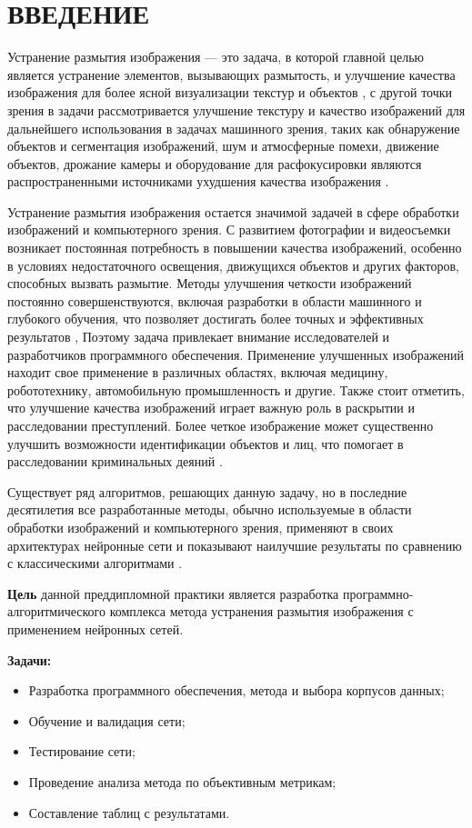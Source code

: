 \part*{ВВЕДЕНИЕ}

Устранение размытия изображения — это задача, в которой главной целью является устранение элементов, вызывающих размытость, и улучшение качества изображения для более ясной визуализации текстур и объектов \cite{shen2018deep}, с другой точки зрения в задачи рассмотривается улучшение текстуру и качество изображений для дальнейшего использования в задачах машинного зрения, таких как обнаружение объектов и сегментация изображений, шум и атмосферные помехи, движение объектов, дрожание камеры и оборудование для расфокусировки являются распространенными источниками ухудшения качества изображения \cite{NIPS2009_3dd48ab3}.

Устранение размытия изображения остается значимой задачей в сфере обработки изображений и компьютерного зрения. С развитием фотографии и видеосъемки возникает постоянная потребность в повышении качества изображений, особенно в условиях недостаточного освещения, движущихся объектов и других факторов, способных вызвать размытие. Методы улучшения четкости изображений постоянно совершенствуются, включая разработки в области машинного и глубокого обучения, что позволяет достигать более точных и эффективных результатов \cite{Lian2023}, Поэтому задача привлекает внимание исследователей и разработчиков программного обеспечения. Применение улучшенных изображений находит свое применение в различных областях, включая медицину, робототехнику, автомобильную промышленность и другие. Также стоит отметить, что улучшение качества изображений играет важную роль в раскрытии и расследовании преступлений. Более четкое изображение может существенно улучшить возможности идентификации объектов и лиц, что помогает в расследовании криминальных деяний \cite{sun2010}.

Существует ряд алгоритмов, решающих данную задачу, но в последние десятилетия все разработанные методы, обычно используемые в области обработки изображений и компьютерного зрения, применяют в своих архитектурах нейронные сети и показывают наилучшие результаты по сравнению с классическими алгоритмами \cite{zhang2022deep}. 

\textbf{Цель} данной преддипломной практики является разработка программно-алгоритмического комплекса метода устранения размытия изображения с применением нейронных сетей.

\textbf{Задачи:}

\begin{itemize}
    \item Разработка программного обеспечения, метода и выбора корпусов данных;
    \item Обучение и валидация сети;
    \item Тестирование сети;
    \item Проведение анализа метода по объективным метрикам;
    \item Составление таблиц с результатами.
\end{itemize}
